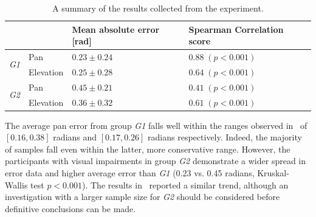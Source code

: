 \documentclass{llncs}
\begin{document}
\begin{table}
  \centering
  \caption{A summary of the results collected from the experiment. }\label{tab:results}
  \begin{tabular}{p{1cm}p{2cm}p{2.2cm}@{\hskip 1cm}p{3.2cm}}
    \toprule
    &           & Mean absolute error [rad]  & Spearman Correlation score \\ \midrule
    \multirow{2}{*}{\textit{G1}} & Pan       & $0.23\pm0.24$ & $0.88\;(p<0.001)$ \\
				 & Elevation & $0.25\pm0.28$ & $0.64\;(p<0.001)$ \\ \midrule
    \multirow{2}{*}{\textit{G2}} & Pan       & $0.45\pm0.21$ & $0.41\;(p<0.001)$ \\
				 & Elevation & $0.36\pm0.32$ & $0.61\;(p<0.001)$ \\
    \bottomrule
  \end{tabular}
\end{table}

The average pan error from group \textit{G1} falls well within the ranges observed in~\cite{macdonald2006spatial,schonstein2008comparison} of $[0.16, 0.38]$ radians and $[0.17, 0.26]$ radians respectively. 
Indeed, the majority of samples fall even within the latter, more conservative range. 
However, the participants with visual impairments in group \textit{G2}  demonstrate a wider spread in error data and higher average error than \textit{G1} (0.23 vs. 0.45 radians, Kruskal-Wallis test $p<0.001$). 
The results in~\cite{katz2011spatial,zwiers2001spatial} reported a similar trend, although an investigation with a larger sample size for \textit{G2} should be considered before definitive conclusions can be made.
\end{document}
